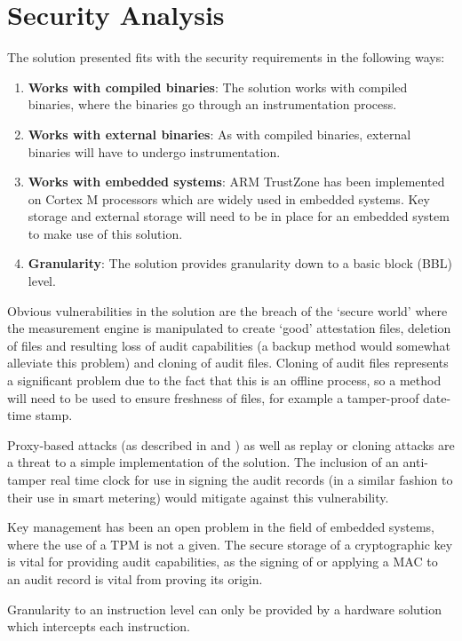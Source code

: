 \section{Security Analysis}

The solution presented fits with the security requirements in the following ways:
\begin{enumerate}
	\item \textbf{Works with compiled binaries}: The solution works with compiled binaries, where the binaries go through an instrumentation process.
	\item \textbf{Works with external binaries}: As with compiled binaries, external binaries will have to undergo instrumentation.
	\item \textbf{Works with embedded systems}: ARM TrustZone has been implemented on Cortex M processors which are widely used in embedded systems. Key storage and external storage will need to be in place for an embedded system to make use of this solution.
	\item \textbf{Granularity}: The solution provides granularity down to a basic block (BBL) level.
\end{enumerate}

Obvious vulnerabilities in the solution are the breach of the `secure world' where the measurement engine is manipulated to create `good' attestation files, deletion of files and resulting loss of audit capabilities (a backup method would somewhat alleviate this problem) and cloning of audit files. Cloning of audit files represents a significant problem due to the fact that this is an offline process, so a method will need to be used to ensure freshness of files, for example a tamper-proof date-time stamp.

Proxy-based attacks (as described in \cite{Seshadri2007} and \cite{Li2011}) as well as replay or cloning attacks are a threat to a simple implementation of the solution. The inclusion of an anti-tamper real time clock for use in signing the audit records (in a similar fashion to their use in smart metering) would mitigate against this vulnerability.

Key management has been an open problem in the field of embedded systems, where the use of a TPM is not a given. The secure storage of a cryptographic key is vital for providing audit capabilities, as the signing of or applying a MAC to an audit record is vital from proving its origin.

Granularity to an instruction level can only be provided by a hardware solution which intercepts each instruction.

